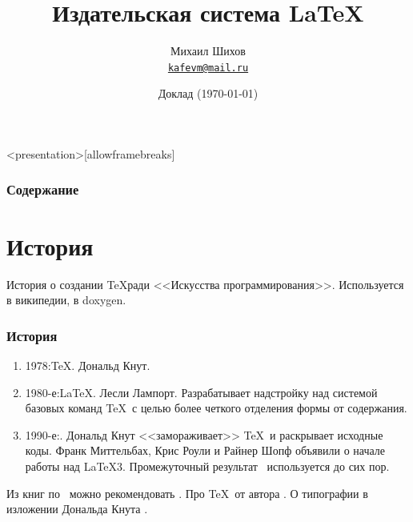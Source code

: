 

\usepackage[russian]{babel}
\usepackage[utf8]{inputenc}
\usepackage{graphicx}
\usepackage{verbatim}


\title[Основы \LaTeX]{Издательская система \LaTeX}
\date{Доклад (\today)}
\author[М.~М.~Шихов]{Михаил Шихов \\ \texttt{\underline{kafevm@mail.ru}}}






\begin{frame}<presentation>[allowframebreaks]
\frametitle{Содержание}
\tableofcontents
\end{frame}


\section{История}

История о создании \TeX ради <<Искусства программирования>>. Используется в википедии, в doxygen.

\begin{frame}
\frametitle{История}
\begin{enumerate}
    \item 1978:\TeX. Дональд Кнут.
    \item 1980-е:\LaTeX. Лесли Лампорт. Разрабатывает надстройку над системой базовых команд \TeX\ с целью более четкого отделения формы от содержания.
    \item 1990-е:\LaTeXe. Дональд Кнут <<замораживает>> \TeX\ и раскрывает исходные коды. Франк Миттельбах, Крис Роули и Райнер Шопф объявили о начале работы над \LaTeX3. Промежуточный результат \LaTeXe\ используется до сих пор.
\end{enumerate}

Из книг по \LaTeXe\ можно рекомендовать \cite{bib:cotelnikov,bib:baldin}. Про \TeX\ от автора \cite{bib:knuthAllAbout}. О типографии в изложении Дональда Кнута \cite{bib:knuthTypograph}.
\end{frame}


